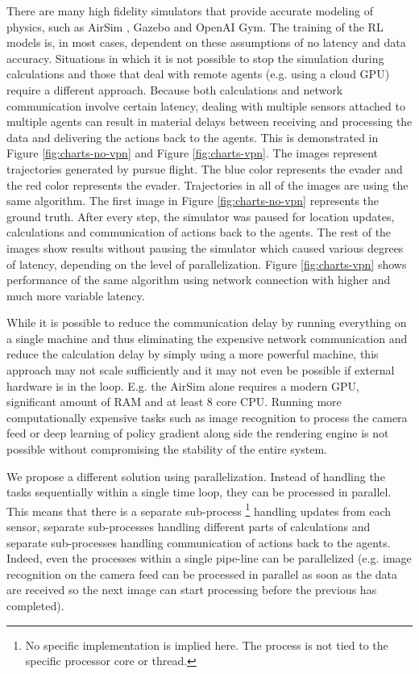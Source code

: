 \documentclass{article}
\begin{document}
There are many high fidelity simulators that provide accurate modeling of physics, such as AirSim \cite{shah2018airsim}, Gazebo and OpenAI Gym. The training of the RL models is, in most cases, dependent on these assumptions of no latency and data accuracy. Situations in which it is not possible to stop the simulation during calculations and those that deal with remote agents (e.g. using a cloud GPU) require a different approach. Because both calculations and network communication involve certain latency, dealing with multiple sensors attached to multiple agents can result in material delays between receiving and processing the data and delivering the actions back to the agents. This is demonstrated in Figure \ref{fig:charts-no-vpn} and Figure \ref{fig:charts-vpn}. The images represent trajectories generated by pursue flight. The blue color represents the evader and the red color represents the evader. Trajectories in all of the images are using the same algorithm. The first image in Figure \ref{fig:charts-no-vpn} represents the ground truth. After every step, the simulator was paused for location updates, calculations and communication of actions back to the agents. The rest of the images show results without pausing the simulator which caused various degrees of latency, depending on the level of parallelization. Figure \ref{fig:charts-vpn} shows performance of the same algorithm using network connection with higher and much more variable latency.

While it is possible to reduce the communication delay by running everything on a single machine and thus eliminating the expensive network communication and reduce the calculation delay by simply using a more powerful machine, this approach may not scale sufficiently and it may not even be possible if external hardware is in the loop. E.g. the AirSim alone requires a modern GPU, significant amount of RAM and at least 8 core CPU. Running more computationally expensive tasks such as image recognition to process the camera feed or deep learning of policy gradient along side the rendering engine is not possible without compromising the stability of the entire system.

We propose a different solution using parallelization. Instead of handling the tasks sequentially within a single time loop, they can be processed in parallel. This means that there is a separate sub-process \footnote{No specific implementation is implied here. The process is not tied to the specific processor core or thread.} handling updates from each sensor, separate sub-processes handling different parts of calculations and separate sub-processes handling communication of actions back to the agents. Indeed, even the processes within a single pipe-line can be parallelized (e.g. image recognition on the camera feed can be processed in parallel as soon as the data are received so the next image can start processing before the previous has completed).
\end{document}
